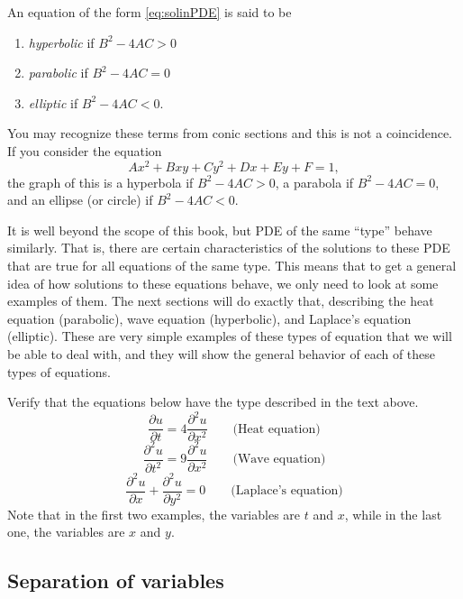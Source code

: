 \begin{definition}
An equation of the form \eqref{eq:solinPDE} is said to be
\begin{enumerate}
\item \emph{hyperbolic} if $B^2 - 4AC > 0$
\item \emph{parabolic} if $B^2 - 4AC = 0$
\item \emph{elliptic} if $B^2 - 4AC < 0$.
\end{enumerate}
\end{definition}

\begin{remark}
You may recognize these terms from conic sections and this is not a coincidence. If you consider the equation
\[ Ax^2 + Bxy + Cy^2 + Dx + Ey + F = 1, \] the graph of this is a hyperbola if $B^2 - 4AC > 0$, a parabola if $B^2 - 4AC = 0$, and an ellipse (or circle) if $B^2 - 4AC < 0$.
\end{remark}

It is well beyond the scope of this book, but PDE of the same ``type'' behave similarly. That is, there are certain characteristics  of the solutions to these PDE that are true for all equations of the same type. This means that to get a general idea of how solutions to these equations behave, we only need to look at some examples of them. The next sections will do exactly that, describing the heat equation (parabolic), wave equation (hyperbolic), and Laplace's equation (elliptic). These are very simple examples of these types of equation that we will be able to deal with, and they will show the general behavior of each of these types of equations. 

\begin{exercise}
Verify that the equations below have the type described in the text above.
\[ \frac{\partial u}{\partial t} = 4 \frac{\partial^2 u}{\partial x^2} \qquad \text{(Heat equation)} \]
\[ \frac{\partial^2 u}{\partial t^2} = 9 \frac{\partial^2 u}{\partial x^2} \qquad \text{(Wave equation)} \]
\[ \frac{\partial^2 u}{\partial x} + \frac{\partial^2 u}{\partial y^2} = 0 \qquad \text{(Laplace's equation)} \]
Note that in the first two examples, the variables are $t$ and $x$, while in the last one, the variables are $x$ and $y$. 
\end{exercise}

\subsection{Separation of variables}

